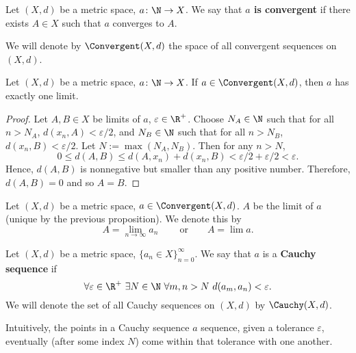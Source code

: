 \begin{definition}
  Let
    $(X, d)$ be a metric space,
    $a \colon \N \to X$.
  We say that \textbf{$a$ is convergent} if
  there exists $A \in X$ such that $a$ converges to $A$.

  We will denote by $\Convergent(X, d)$
  the space of all convergent sequences on $(X, d)$.
\end{definition}
\begin{proposition}
  Let
    $(X, d)$ be a metric space,
    $a \colon \N \to X$.
  If $a \in \Convergent(X, d)$, then $a$ has exactly one limit.
\end{proposition}
\begin{proof}
  Let $A, B \in X$ be limits of $a$, $\varepsilon \in \R^+$.
  Choose
    $N_A \in \N$ such that for all $n > N_A$, $d(x_n, A) < \varepsilon / 2$, and
    $N_B \in \N$ such that for all $n > N_B$, $d(x_n, B) < \varepsilon / 2$.
  Let $N := \max(N_A, N_B)$.
  Then for any $n > N$,
  \begin{equation}
    0
    \leq d(A, B)
    \leq d(A, x_n) + d(x_n, B)
    < \varepsilon / 2 + \varepsilon / 2
    < \varepsilon.
  \end{equation}
  Hence, $d(A, B)$ is nonnegative but smaller than any positive number.
  Therefore, $d(A, B) = 0$ and so $A = B$.
\end{proof}
\begin{notation}
  Let
    $(X, d)$ be a metric space,
    $a \in \Convergent(X, d)$.
    $A$ be the limit of $a$ (unique by the previous proposition).
  We denote this by
  \begin{equation}
    A = \lim_{n \to \infty} a_n\ \qquad \text{or} \qquad A = \lim a.
  \end{equation}
\end{notation}
\begin{definition}
  Let
    $(X, d)$ be a metric space,
    $\{a_n \in X\}_{n = 0}^\infty$.
  We say that $a$ is a \textbf{Cauchy sequence} if
  \begin{equation}
    \forall \varepsilon \in \R^+\
      \exists N \in \N\
        \forall m, n > N\
          d(a_m, a_n) < \varepsilon.
  \end{equation}
  We will denote the set of all Cauchy sequences on $(X, d)$ by $\Cauchy(X, d)$.
\end{definition}
\begin{remark}
  Intuitively, the points in a Cauchy sequence $a$ sequence, given a tolerance
  $\varepsilon$, eventually (after some index $N$) come within that tolerance
  with one another.
\end{remark}

